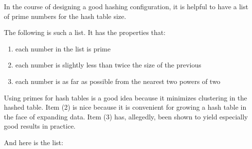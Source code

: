 \documentclass[12pt]{article}
\begin{document}

In the course of designing a good hashing configuration, it is helpful to have a list of prime numbers for the hash table size.

The following is such a list.  It has the properties that:

\begin{enumerate}

\item each number in the list is prime 
\item each number is slightly less than twice the size of the previous
\item each number is as far as possible from the nearest two powers of two

\end{enumerate}

Using primes for hash tables is a good idea because it minimizes clustering in the hashed table.  Item (2) is nice because it is convenient for growing a hash table in the face of expanding data.  Item (3) has, allegedly, been shown to yield especially good results in practice.

And here is the list:
\end{document}
